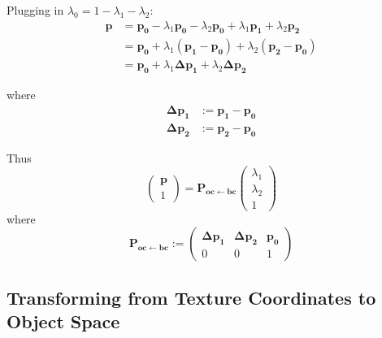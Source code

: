 \documentclass{article}
\newcommand{\point}[1]{\mathbf{#1}}
\newcommand{\mat}[1]{\mathbf{#1}}
\newcommand{\pMat}[2]{\mat{P_{#1 \leftarrow #2}}}
\newcommand{\colvec}[1]{\begin{pmatrix}#1\end{pmatrix}}
\begin{document}
Plugging in \(\lambda_0 = 1 - \lambda_1 - \lambda_2\):
\begin{align*}
\point{p} &= \point{p_0} - \lambda_1 \point{p_0} - \lambda_2 \point{p_0}  + \lambda_1 \point{p_1} + \lambda_2 \point{p_2} \\
&= \point{p_0}  + \lambda_1 (\point{p_1}-\point{p_0}) + \lambda_2 (\point{p_2} - \point{p_0})\\
&= \point{p_0} + \lambda_1 \point{\Delta p_1} + \lambda_2 \point{\Delta p_2}
\end{align*}

where
\begin{align*}
\point{\Delta p_1} &:= \point{p_1} - \point{p_0}\\
\point{\Delta p_2} &:= \point{p_2} - \point{p_0}
\end{align*}

Thus
\[
 \colvec{\point{p}\\1} = \pMat{oc}{bc} \colvec{\lambda_1 \\ \lambda_2 \\ 1}
\]
where
\begin{equation}
\label{eq:mat_oc_from_bc}
 \pMat{oc}{bc} := \begin{pmatrix} 
                  \point{\Delta p_1} & \point{\Delta p_2} & \point{p_0} \\
                  0 & 0 & 1
                 \end{pmatrix}
\end{equation}


\subsection{Transforming from Texture Coordinates to Object Space}
\end{document}
